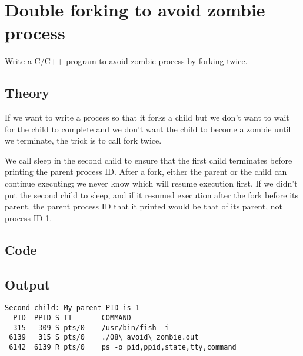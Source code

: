 \chapter{Double forking to avoid zombie process}

Write a C/C++ program to avoid zombie process by forking twice.

\section{Theory}

If we want to write a process so that it forks a child but we don't want to wait for the child to complete and we don't want the child to become a zombie until we terminate, the trick is to call fork twice.

We call sleep in the second child to ensure that the first child terminates before printing the parent process ID. After a fork, either the parent or the child can continue executing; we never know which will resume execution first. If we didn't put the second child to sleep, and if it resumed execution after the fork before its parent, the parent process ID that it printed would be that of its parent, not process ID 1.

\section{Code}



\section{Output}

\begin{lstlisting}[style=shell-output]
Second child: My parent PID is 1
  PID  PPID S TT       COMMAND
  315   309 S pts/0    /usr/bin/fish -i
 6139   315 S pts/0    ./08\_avoid\_zombie.out
 6142  6139 R pts/0    ps -o pid,ppid,state,tty,command
\end{lstlisting}

